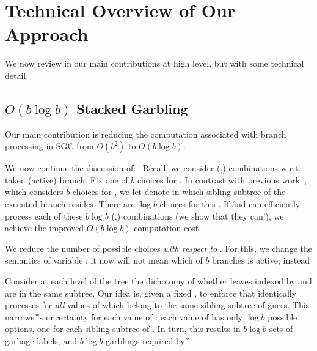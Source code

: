 
\section{Technical Overview of Our Approach}
\label{sec:techOverview}

We  now review in  our main contributions at high level, but with some technical detail.
\subsection{$O(b\log b)$ Stacked Garbling}
\label{sec:techOverviewSG}

Our main contribution is reducing the computation associated with branch processing in SGC from $O(b^2)$ to $O(b \log b)$.

We now continue the discussion of~.  
Recall, we consider (\truth,\guess) combinations w.r.t. taken (active) branch.  Fix one of $b$ choices for \guess.  In contrast with previous work~\HK, which considers $b$ choices for \truth, we let \truth  denote in which sibling subtree of \guess the executed branch resides.  There are $\log b$ choices for this \truth.  If \G and \E can efficiently process each of these $b\log b$  (\truth,\guess) combinations  (we show that they can!), we achieve the improved $O(b\log b)$ computation cost.

We reduce the number of possible \truth choices  {\em with respect to  \guess}.  For this, we  change the semantics of variable \truth: it now will not mean which of $b$ branches is active; instead 



 Consider at each level of the tree the dichotomy of whether leaves indexed by \guess and \truth are in the same subtree. Our idea is, given a fixed \guess, to  enforce that \E identically processes \guess for {\em all} values of \truth which belong to the same sibling subtree of guess. This narrows \G’s uncertainty for each value of \guess: each value of \guess has only $\log b$ possible \truth options, one for each sibling subtree of \guess.  In turn, this results in $b\log b$  sets of garbage labels, and $b\log b$ garblings required by \G. 


\medskip



